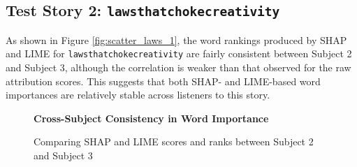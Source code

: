 \documentclass[10pt,letterpaper]{article}
\begin{document}
\subsection{Test Story 2: \texttt{lawsthatchokecreativity}}

As shown in Figure \ref{fig:scatter_laws_1}, the word rankings produced by SHAP and LIME for \texttt{lawsthatchokecreativity} are fairly consistent between Subject 2 and Subject 3, although the correlation is weaker than that observed for the raw attribution scores. This suggests that both SHAP- and LIME-based word importances are relatively stable across listeners to this story.


\begin{figure}[ht]
    \centering

    \parbox{\textwidth}{\centering 
        \fontsize{13pt}{13pt}\selectfont \textbf{Cross-Subject Consistency in Word Importance}  
        
        {\fontsize{11pt}{13pt}\selectfont Comparing SHAP and LIME scores and ranks between Subject 2 and Subject 3} 
    }
    

\end{figure}
\end{document}
